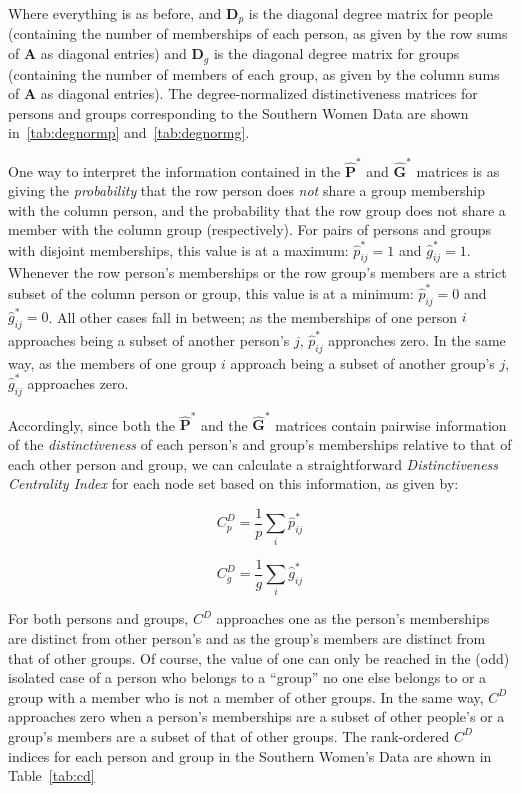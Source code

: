 \documentclass[a4paper,fleqn]{cas-sc}
\begin{document}
Where everything is as before, and $\textbf{D}_p$ is the diagonal degree matrix for people (containing the number of memberships of each person, as given by the row sums of $\mathbf{A}$ as diagonal entries) and $\textbf{D}_g$ is the diagonal degree matrix for groups (containing the number of members of each group, as given by the column sums of $\mathbf{A}$ as diagonal entries). The degree-normalized distinctiveness matrices for persons and groups corresponding to the Southern Women Data are shown in~\ref{tab:degnormp} and~\ref{tab:degnormg}.

One way to interpret the information contained in the $\hat{\textbf{P}}^*$ and $\hat{\textbf{G}}^*$ matrices is as giving the \textit{probability} that the row person does \textit{not} share a group membership with the column person, and the probability that the row group does not share a member with the column group (respectively). For pairs of persons and groups with disjoint memberships, this value is at a maximum: $\hat{p}_{ij}^* = 1$ and $\hat{g}_{ij}^* = 1$. Whenever the row person's memberships or the row group's members are a strict subset of the column person or group, this value is at a minimum: $\hat{p}_{ij}^* = 0$ and $\hat{g}_{ij}^* = 0$. All other cases fall in between; as the memberships of one person $i$ approaches being a subset of another person's $j$, $\hat{p}_{ij}^*$ approaches zero. In the same way, as the members of one group $i$ approach being a subset of another group's $j$, $\hat{g}_{ij}^*$ approaches zero. 

Accordingly, since both the $\hat{\textbf{P}}^*$ and the $\hat{\textbf{G}}^*$ matrices contain pairwise information of the \textit{distinctiveness} of each person's and group's memberships relative to that of each other person and group, we can calculate a straightforward \textit{Distinctiveness Centrality Index} for each node set based on this information, as given by:

\begin{equation}
    C^{D}_p = \frac{1}{p}\sum_i \hat{p}_{ij}^*
\end{equation}

\begin{equation}
     C^{D}_g = \frac{1}{g}\sum_i \hat{g}_{ij}^*
\end{equation}

For both persons and groups, $C^{D}$ approaches one as the person's memberships are distinct from other person's and as the group's members are distinct from that of other groups. Of course, the value of one can only be reached in the (odd) isolated case of a person who belongs to a ``group'' no one else belongs to or a group with a member who is not a member of other groups. In the same way, $C^{D}$ approaches zero when a person's memberships are a subset of other people's or a group's members are a subset of that of other groups. The rank-ordered $C^D$ indices for each person and group in the Southern Women's Data are shown in Table~\ref{tab:cd}


% 



\end{document}
